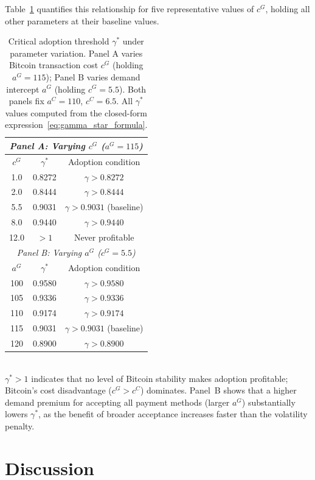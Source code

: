 \documentclass{article}
\begin{document}
Table~\ref{tab:sensitivity} quantifies this relationship for five representative
values of $c^G$, holding all other parameters at their baseline values.

\begin{table}[h]
\centering
\caption{Critical adoption threshold $\gamma^*$ under parameter variation.
Panel A varies Bitcoin transaction cost $c^G$ (holding $a^G = 115$);
Panel B varies demand intercept $a^G$ (holding $c^G = 5.5$).
Both panels fix $a^C = 110$, $c^C = 6.5$.
All $\gamma^*$ values computed from the closed-form
expression~\eqref{eq:gamma_star_formula}.}
\label{tab:sensitivity}
\begin{tabular}{ccc}
\toprule
\multicolumn{3}{c}{\textit{Panel A: Varying $c^G$ ($a^G = 115$)}} \\
\midrule
$c^G$ & $\gamma^*$ & Adoption condition \\
\midrule
1.0  & 0.8272 & $\gamma > 0.8272$ \\
2.0  & 0.8444 & $\gamma > 0.8444$ \\
5.5  & 0.9031 & $\gamma > 0.9031$ \quad (baseline) \\
8.0  & 0.9440 & $\gamma > 0.9440$ \\
12.0 & $>1$   & Never profitable \\
\midrule
\multicolumn{3}{c}{\textit{Panel B: Varying $a^G$ ($c^G = 5.5$)}} \\
\midrule
$a^G$ & $\gamma^*$ & Adoption condition \\
\midrule
100 & 0.9580 & $\gamma > 0.9580$ \\
105 & 0.9336 & $\gamma > 0.9336$ \\
110 & 0.9174 & $\gamma > 0.9174$ \\
115 & 0.9031 & $\gamma > 0.9031$ \quad (baseline) \\
120 & 0.8900 & $\gamma > 0.8900$ \\
\bottomrule
\end{tabular}
\smallskip\\
{\small $\gamma^* > 1$ indicates that no level of Bitcoin stability makes
adoption profitable; Bitcoin's cost disadvantage ($c^G > c^C$) dominates.
Panel~B shows that a higher demand premium for accepting all payment methods
(larger $a^G$) substantially lowers $\gamma^*$, as the benefit of broader
acceptance increases faster than the volatility penalty.}
\end{table}

\section{Discussion}
\label{sec:discussion}
\end{document}

